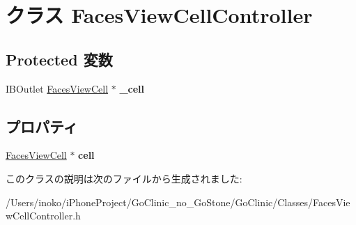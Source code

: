 \hypertarget{interface_faces_view_cell_controller}{
\section{クラス FacesViewCellController}
\label{interface_faces_view_cell_controller}
}
\subsection*{Protected 変数}
\begin{DoxyCompactItemize}
\item 
\hypertarget{interface_faces_view_cell_controller_ac3c41a37bbba25bd20b72e3982da81b4}{
IBOutlet \hyperlink{interface_faces_view_cell}{FacesViewCell} $\ast$ {\bfseries \_\-cell}}
\label{interface_faces_view_cell_controller_ac3c41a37bbba25bd20b72e3982da81b4}

\end{DoxyCompactItemize}
\subsection*{プロパティ}
\begin{DoxyCompactItemize}
\item 
\hypertarget{interface_faces_view_cell_controller_a731d8597ceca6ecac818a0d355fd29a5}{
\hyperlink{interface_faces_view_cell}{FacesViewCell} $\ast$ {\bfseries cell}}
\label{interface_faces_view_cell_controller_a731d8597ceca6ecac818a0d355fd29a5}

\end{DoxyCompactItemize}


このクラスの説明は次のファイルから生成されました:\begin{DoxyCompactItemize}
\item 
/Users/inoko/iPhoneProject/GoClinic\_\-no\_\-GoStone/GoClinic/Classes/FacesViewCellController.h\end{DoxyCompactItemize}
